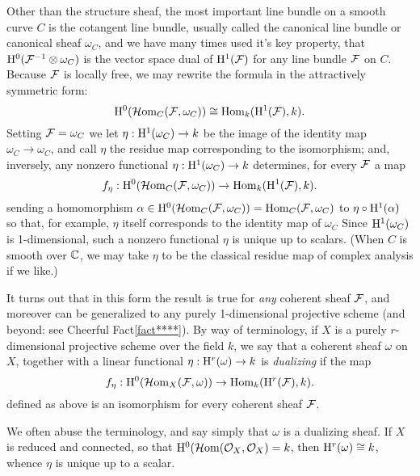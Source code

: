 Other than  the structure sheaf, the most important line bundle on a smooth curve $C$  is the cotangent line bundle, usually called the canonical line bundle or canonical sheaf $\omega_{C}$, and  we have many times used it's key property, that ${\rm{H}}^{0}({\mathcal F}^{-1}\otimes \omega_{C})$ is the vector space dual of ${\rm{H}}^{1}({\mathcal F})$ for any line bundle ${\mathcal F}$ on $C$. Because ${\mathcal F}$ is locally free, we may rewrite the formula in the attractively symmetric form:
$$
{\rm{H}}^{0}(\operatorname{{\mathcal H} om}_{C}({\mathcal F}, \omega_{C})) 
\cong 
\operatorname{Hom}_{k}({\rm{H}}^{1}({\mathcal F}), k).
$$
Setting ${\mathcal F} = \omega_{C}$ we let $\eta: {\rm{H}}^{1}(\omega_{C})\to k$ be the image of 
the identity map $\omega_{C} \to \omega_{C}$, and call $\eta$ the residue map corresponding to the isomorphism; and, inversely, any nonzero functional 
$\eta: {\rm{H}}^{1}(\omega_{C})\to k$
determines, for every ${\mathcal F}$ a map
$$
f_{\eta}: {\rm{H}}^{0}(\operatorname{{\mathcal H} om}_{C}({\mathcal F}, \omega_{C}))
\to
\operatorname{Hom}_{k}({\rm{H}}^{1}({\mathcal F}), k).
$$
sending a homomorphism
$\alpha \in {\rm{H}}^{0}(\operatorname{{\mathcal H} om}_{C}({\mathcal F}, \omega_{C})) = \operatorname{Hom}_{C}({\mathcal F}, \omega_{C})$
to $\eta \circ {\rm{H}}^{1}(\alpha)$ so that, for example, $\eta$ itself corresponds to the 
identity map of $\omega_{C}$  Since ${\rm{H}}^{1}(\omega_{C})$ is 1-dimensional, such a nonzero functional $\eta$ is unique up to scalars. (When $C$ is smooth over ${\mathbb C}$, we may take $\eta$ to be the classical residue map of complex analysis if we like.)

It turns out that in this form the result is true for \emph{any} coherent sheaf ${\mathcal F}$, and moreover can be generalized to any purely 1-dimensional projective scheme (and beyond: see Cheerful Fact\ref{fact****}). By way of terminology, if $X$ is a purely $r$-dimensional projective scheme over the field $k$, we say that a coherent sheaf $\omega$ on $X$, together with a linear
functional $\eta:{\rm{H}}^{r}(\omega) \to k$ is \emph{dualizing} if the map
$$
f_{\eta}: {\rm{H}}^{0}(\operatorname{{\mathcal H} om}_{X}({\mathcal F}, \omega))
\to
\operatorname{Hom}_{k}({\rm{H}}^{r}({\mathcal F}), k).
$$
defined as above is an isomorphism for every coherent sheaf ${\mathcal F}$.

We often abuse the terminology, and say simply that $\omega$ is a dualizing sheaf. If $X$ is reduced and connected, so that ${\rm{H}}^{0} (\operatorname{{\mathcal H} om}({\mathcal O}_{X} , {\mathcal O}_{X}) = k$, then
${\rm{H}}^{r}(\omega) \cong k$, whence $\eta$ is unique up to a scalar. 


